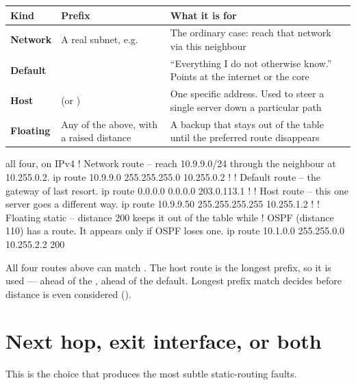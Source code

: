 \begin{longtable}{@{}L{2.8cm}L{4.4cm}L{7.8cm}@{}}
\toprule
{}
\textbf{Kind} & \textbf{Prefix} & \textbf{What it is for} \\
\midrule
\endhead
\textbf{Network} & A real subnet, e.g.\  &
The ordinary case: reach that network via this neighbour \\
\textbf{Default} &  &
``Everything I do not otherwise know.'' Points at the internet or the core \\
\textbf{Host} &  (or ) &
One specific address. Used to steer a single server down a particular path \\
\textbf{Floating} & Any of the above, with a raised distance &
A backup that stays out of the table until the preferred route disappears \\
\bottomrule
\end{longtable}

\begin{config}{all four, on IPv4}
! Network route -- reach 10.9.9.0/24 through the neighbour at 10.255.0.2.
ip route 10.9.9.0 255.255.255.0 10.255.0.2
!
! Default route -- the gateway of last resort.
ip route 0.0.0.0 0.0.0.0 203.0.113.1
!
! Host route -- this one server goes a different way.
ip route 10.9.9.50 255.255.255.255 10.255.1.2
!
! Floating static -- distance 200 keeps it out of the table while
! OSPF (distance 110) has a route. It appears only if OSPF loses one.
ip route 10.1.0.0 255.255.0.0 10.255.2.2 200
\end{config}

\begin{conceptbox}
All four routes above can match . The  host route is the
longest prefix, so it is used --- ahead of the , ahead of the default.
Longest prefix match decides before distance is even considered
().
\end{conceptbox}

\section{Next hop, exit interface, or both}

This is the choice that produces the most subtle static-routing faults.

